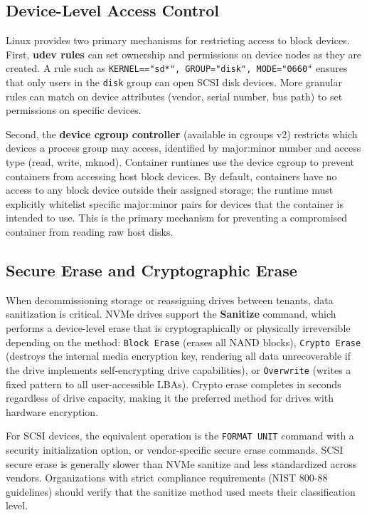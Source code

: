 \begin{securitybox}

\subsection*{Device-Level Access Control}

Linux provides two primary mechanisms for restricting access to block devices. First, \textbf{udev rules} can set ownership and permissions on device nodes as they are created. A rule such as \texttt{KERNEL=="sd*", GROUP="disk", MODE="0660"} ensures that only users in the \texttt{disk} group can open SCSI disk devices. More granular rules can match on device attributes (vendor, serial number, bus path) to set permissions on specific devices.

Second, the \textbf{device cgroup controller} (available in cgroups v2) restricts which devices a process group may access, identified by major:minor number and access type (read, write, mknod). Container runtimes use the device cgroup to prevent containers from accessing host block devices. By default, containers have no access to any block device outside their assigned storage; the runtime must explicitly whitelist specific major:minor pairs for devices that the container is intended to use. This is the primary mechanism for preventing a compromised container from reading raw host disks.

\subsection*{Secure Erase and Cryptographic Erase}

When decommissioning storage or reassigning drives between tenants, data sanitization is critical. NVMe drives support the \textbf{Sanitize} command, which performs a device-level erase that is cryptographically or physically irreversible depending on the method: \texttt{Block Erase} (erases all NAND blocks), \texttt{Crypto Erase} (destroys the internal media encryption key, rendering all data unrecoverable if the drive implements self-encrypting drive capabilities), or \texttt{Overwrite} (writes a fixed pattern to all user-accessible LBAs). Crypto erase completes in seconds regardless of drive capacity, making it the preferred method for drives with hardware encryption.

For SCSI devices, the equivalent operation is the \texttt{FORMAT UNIT} command with a security initialization option, or vendor-specific secure erase commands. SCSI secure erase is generally slower than NVMe sanitize and less standardized across vendors. Organizations with strict compliance requirements (NIST 800-88 guidelines) should verify that the sanitize method used meets their classification level.


\end{securitybox}
